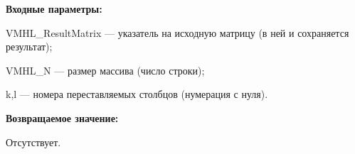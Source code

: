 \textbf{Входные параметры:} 
 
VMHL\_ResultMatrix --- указатель на исходную матрицу (в ней и сохраняется результат);
 
VMHL\_N --- размер массива (число строки);
 
k,l --- номера переставляемых столбцов (нумерация с нуля).

\textbf{Возвращаемое значение:}

Отсутствует.